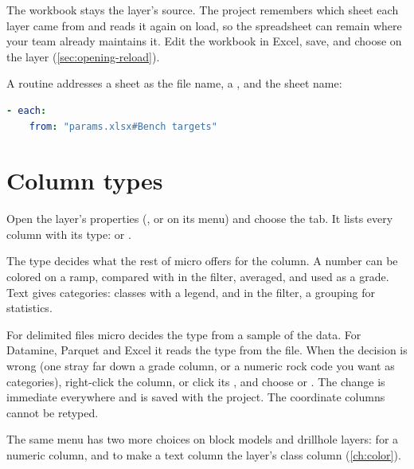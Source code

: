 The workbook stays the layer's source. The project remembers which sheet each layer came from and reads it again on load, so the spreadsheet can remain where your team already maintains it. Edit the workbook in Excel, save, and choose  on the layer (\cref{sec:opening-reload}).

A routine addresses a sheet as the file name, a \code{\#}, and the sheet name:

\begin{lstlisting}[language=yaml]
- each:
    from: "params.xlsx#Bench targets"
\end{lstlisting}

\section{Column types}\label{sec:columns-types}

Open the layer's properties (, or  on its menu) and choose the  tab. It lists every column with its type:  or .


The type decides what the rest of micro offers for the column. A number can be colored on a ramp, compared with \code{>} in the filter, averaged, and used as a grade. Text gives categories: classes with a legend, \code{=} and  in the filter, a grouping for statistics.

For delimited files micro decides the type from a sample of the data. For Datamine, Parquet and Excel it reads the type from the file. When the decision is wrong (one stray  far down a grade column, or a numeric rock code you want as categories), right-click the column, or click its , and choose  or . The change is immediate everywhere and is saved with the project. The coordinate columns cannot be retyped.

The same menu has two more choices on block models and drillhole layers:  for a numeric column, and  to make a text column the layer's class column (\cref{ch:color}).

